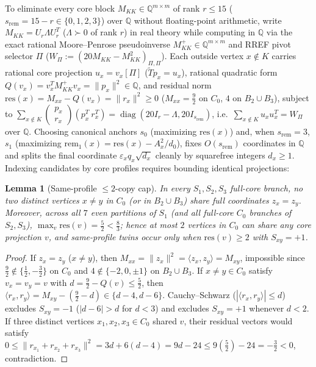 \documentclass[11pt,reqno]{amsart}
\newtheorem{lemma}[theorem]{Lemma}
\theoremstyle{definition}
\theoremstyle{remark}
\DeclareMathOperator{\diag}{diag}
\begin{document}
To eliminate every core block $M_{KK} \in \mathbb{Q}^{m \times m}$ of rank $r \le 15$ ($s_{\mathrm{rem}} = 15 - r \in \{0, 1, 2, 3\}$) over $\mathbb{Q}$ without floating-point arithmetic, write $M_{KK} = U_r \Lambda U_r^T$ ($\Lambda \succ 0$ of rank $r$) in real theory while computing in $\mathbb{Q}$ via the exact rational Moore--Penrose pseudoinverse $M_{KK}^+ \in \mathbb{Q}^{m \times m}$ and RREF pivot selector $\Pi$ ($W_\Pi := (20 M_{KK} - M_{KK}^2)_{\Pi,\Pi}$). Each outside vertex $x \notin K$ carries rational core projection $u_x = v_x[\Pi]$ ($\tilde{T}p_x = u_x$), rational quadratic form $Q(v_x) = v_x^T M_{KK}^+ v_x = \|p_x\|^2 \in \mathbb{Q}$, and residual norm $\mathrm{res}(x) = M_{xx} - Q(v_x) = \|r_x\|^2 \ge 0$ ($M_{xx} = \frac{9}{2}$ on $C_0$, $4$ on $B_2 \cup B_3$), subject to $\sum_{x \notin K} \left(\begin{smallmatrix} p_x \\ r_x \end{smallmatrix}\right)(p_x^T\ r_x^T) = \diag(20 I_r - \Lambda, 20 I_{s_{\mathrm{rem}}})$, i.e.\ $\sum_{x \notin K} u_x u_x^T = W_\Pi$ over $\mathbb{Q}$. Choosing canonical anchors $s_0$ (maximizing $\mathrm{res}(x)$) and, when $s_{\mathrm{rem}} = 3$, $s_1$ (maximizing $\mathrm{rem}_1(x) = \mathrm{res}(x) - A_x^2 / d_0$), fixes $O(s_{\mathrm{rem}})$ coordinates in $\mathbb{Q}$ and splits the final coordinate $\varepsilon_x q_x \sqrt{d_x}$ cleanly by squarefree integers $d_x \ge 1$. Indexing candidates by core profiles requires bounding identical projections:

\begin{lemma}[Same-profile $\le 2$-copy cap]\label{lem:copycap}
In every $S_1, S_2, S_3$ full-core branch, no two distinct vertices $x \neq y$ in $C_0$ (or in $B_2 \cup B_3$) share full coordinates $z_x = z_y$. Moreover, across all $7$ even partitions of $S_1$ (and all full-core $C_0$ branches of $S_2, S_3$), $\max_{v} \mathrm{res}(v) = \frac{5}{2} < \frac{8}{3}$; hence at most $2$ vertices in $C_0$ can share any core projection $v$, and same-profile twins occur only when $\mathrm{res}(v) \ge 2$ with $S_{xy} = +1$.
\end{lemma}

\begin{proof}
If $z_x = z_y$ ($x \neq y$), then $M_{xx} = \|z_x\|^2 = \langle z_x, z_y \rangle = M_{xy}$, impossible since $\frac{9}{2} \notin \{\frac{1}{2}, -\frac{3}{2}\}$ on $C_0$ and $4 \notin \{-2, 0, \pm 1\}$ on $B_2 \cup B_3$. If $x \neq y \in C_0$ satisfy $v_x = v_y = v$ with $d = \frac{9}{2} - Q(v) \le \frac{5}{2}$, then $\langle r_x, r_y \rangle = M_{xy} - (\frac{9}{2} - d) \in \{d - 4, d - 6\}$. Cauchy--Schwarz ($|\langle r_x, r_y \rangle| \le d$) excludes $S_{xy} = -1$ ($|d - 6| > d$ for $d < 3$) and excludes $S_{xy} = +1$ whenever $d < 2$. If three distinct vertices $x_1, x_2, x_3 \in C_0$ shared $v$, their residual vectors would satisfy $0 \le \|r_{x_1} + r_{x_2} + r_{x_3}\|^2 = 3d + 6(d - 4) = 9d - 24 \le 9(\tfrac{5}{2}) - 24 = -\tfrac{3}{2} < 0$, contradiction.
\end{proof}
\end{document}
